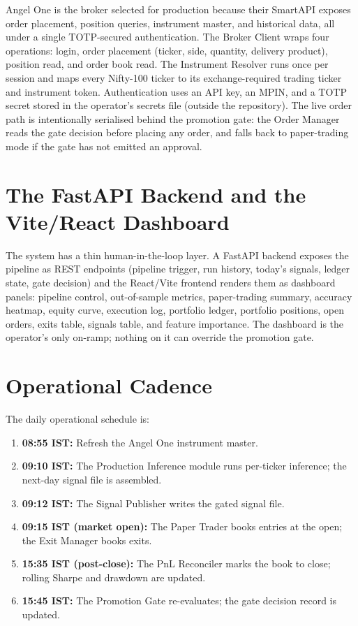 Angel One is the broker selected for production because their SmartAPI exposes order placement, position queries, instrument master, and historical data, all under a single TOTP-secured authentication. The Broker Client wraps four operations: login, order placement (ticker, side, quantity, delivery product), position read, and order book read. The Instrument Resolver runs once per session and maps every Nifty-100 ticker to its exchange-required trading ticker and instrument token. Authentication uses an API key, an MPIN, and a TOTP secret stored in the operator's secrets file (outside the repository). The live order path is intentionally serialised behind the promotion gate: the Order Manager reads the gate decision before placing any order, and falls back to paper-trading mode if the gate has not emitted an approval.

\section{The FastAPI Backend and the Vite/React Dashboard}

The system has a thin human-in-the-loop layer. A FastAPI backend exposes the pipeline as REST endpoints (pipeline trigger, run history, today's signals, ledger state, gate decision) and the React/Vite frontend renders them as dashboard panels: pipeline control, out-of-sample metrics, paper-trading summary, accuracy heatmap, equity curve, execution log, portfolio ledger, portfolio positions, open orders, exits table, signals table, and feature importance. The dashboard is the operator's only on-ramp; nothing on it can override the promotion gate.

\section{Operational Cadence}

The daily operational schedule is:

\begin{enumerate}
    \item \textbf{08:55 IST:} Refresh the Angel One instrument master.
    \item \textbf{09:10 IST:} The Production Inference module runs per-ticker inference; the next-day signal file is assembled.
    \item \textbf{09:12 IST:} The Signal Publisher writes the gated signal file.
    \item \textbf{09:15 IST (market open):} The Paper Trader books entries at the open; the Exit Manager books exits.
    \item \textbf{15:35 IST (post-close):} The PnL Reconciler marks the book to close; rolling Sharpe and drawdown are updated.
    \item \textbf{15:45 IST:} The Promotion Gate re-evaluates; the gate decision record is updated.
\end{enumerate}


